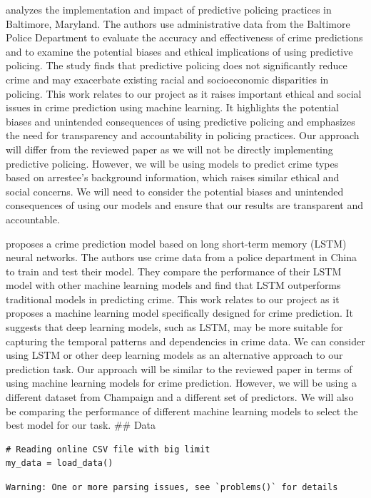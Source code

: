 \documentclass[
  article]{jss}
\begin{document}
\citet{Pearsall2016} analyzes the implementation and impact of
predictive policing practices in Baltimore, Maryland. The authors use
administrative data from the Baltimore Police Department to evaluate the
accuracy and effectiveness of crime predictions and to examine the
potential biases and ethical implications of using predictive policing.
The study finds that predictive policing does not significantly reduce
crime and may exacerbate existing racial and socioeconomic disparities
in policing. This work relates to our project as it raises important
ethical and social issues in crime prediction using machine learning. It
highlights the potential biases and unintended consequences of using
predictive policing and emphasizes the need for transparency and
accountability in policing practices. Our approach will differ from the
reviewed paper as we will not be directly implementing predictive
policing. However, we will be using models to predict crime types based
on arrestee's background information, which raises similar ethical and
social concerns. We will need to consider the potential biases and
unintended consequences of using our models and ensure that our results
are transparent and accountable.

\citet{Lin2018} proposes a crime prediction model based on long
short-term memory (LSTM) neural networks. The authors use crime data
from a police department in China to train and test their model. They
compare the performance of their LSTM model with other machine learning
models and find that LSTM outperforms traditional models in predicting
crime. This work relates to our project as it proposes a machine
learning model specifically designed for crime prediction. It suggests
that deep learning models, such as LSTM, may be more suitable for
capturing the temporal patterns and dependencies in crime data. We can
consider using LSTM or other deep learning models as an alternative
approach to our prediction task. Our approach will be similar to the
reviewed paper in terms of using machine learning models for crime
prediction. However, we will be using a different dataset from Champaign
and a different set of predictors. We will also be comparing the
performance of different machine learning models to select the best
model for our task. \#\# Data

\begin{verbatim}
# Reading online CSV file with big limit
my_data = load_data()
\end{verbatim}

\begin{verbatim}
Warning: One or more parsing issues, see `problems()` for details
\end{verbatim}
\end{document}

